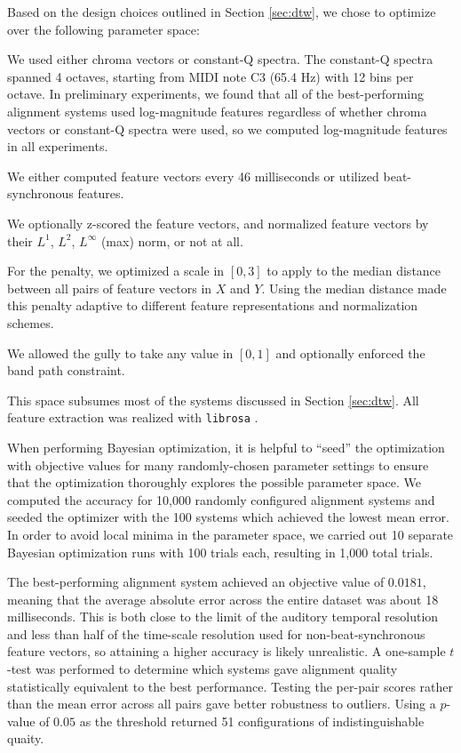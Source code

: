 \documentclass{article}
\begin{document}
Based on the design choices outlined in Section \ref{sec:dtw}, we chose to optimize over the following parameter space:
\begin{description}[topsep=1pt,itemsep=-1pt,leftmargin=5pt]
\item[Feature representation:] We used either chroma vectors or constant-Q spectra.
The constant-Q spectra spanned 4 octaves, starting from MIDI note C3 (65.4 Hz) with 12 bins per octave.
In preliminary experiments, we found that all of the best-performing alignment systems used log-magnitude features regardless of whether chroma vectors or constant-Q spectra were used, so we computed log-magnitude features in all experiments.
\item[Time scale:] We either computed feature vectors every 46 milliseconds or utilized beat-synchronous features.
\item[Normalization:] We optionally z-scored the feature vectors, and normalized feature vectors by their $L^1$, $L^2$, $L^\infty$ (max) norm, or not at all.
\item[Penalty:] For the penalty, we optimized a scale in $[0, 3]$ to apply to the median distance between all pairs of feature vectors in $X$ and $Y$.
Using the median distance made this penalty adaptive to different feature representations and normalization schemes.
\item[Gully and band path constraint:] We allowed the gully to take any value in $[0, 1]$ and optionally enforced the band path constraint.
\end{description}
This space subsumes most of the systems discussed in Section \ref{sec:dtw}.
All feature extraction was realized with \texttt{librosa} \cite{mcfee2015librosa, mcfee2015librosa_scipy}.

When performing Bayesian optimization, it is helpful to ``seed'' the optimization with objective values for many randomly-chosen parameter settings to ensure that the optimization thoroughly explores the possible parameter space.
We computed the accuracy for 10,000 randomly configured alignment systems and seeded the optimizer with the 100 systems which achieved the lowest mean error.
In order to avoid local minima in the parameter space, we carried out 10 separate Bayesian optimization runs with 100 trials each, resulting in 1,000 total trials.

The best-performing alignment system achieved an objective value of $0.0181$, meaning that the average absolute error across the entire dataset was about 18 milliseconds.
This is both close to the limit of the auditory temporal resolution and less than half of the time-scale resolution used for non-beat-synchronous feature vectors, so attaining a higher accuracy is likely unrealistic.
A one-sample $t$-test was performed to determine which systems gave alignment quality statistically equivalent to the best performance. Testing the per-pair scores rather than the mean error across all pairs gave better robustness to outliers.  Using a $p$-value of $0.05$ as the threshold returned 51 configurations of indistinguishable quaity.
\end{document}

